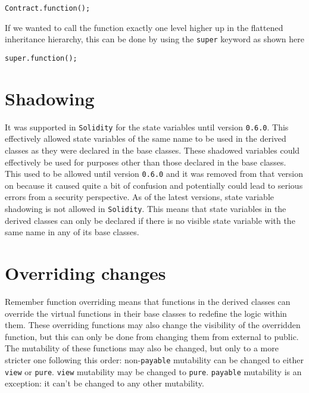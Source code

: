 \begin{lstlisting}[language=Solidity, style=solStyle, caption={Explicit function call from base class example}]
Contract.function();
\end{lstlisting}

If we wanted to call the function exactly one level higher up in the flattened inheritance hierarchy, this can be done by using the \verb|super| keyword as shown here

\begin{lstlisting}[language=Solidity, style=solStyle, caption={"One level up" function call from base class example}]
super.function();
\end{lstlisting}

\section{Shadowing}
It was supported in \verb|Solidity| for the state variables until version \verb|0.6.0|. This effectively allowed state variables of the same name to be used in the derived classes as they were declared in the base classes. These shadowed variables could effectively be used for purposes other than those declared in the base classes. This used to be allowed until version \verb|0.6.0| and it was removed from that version on because it caused quite a bit of confusion and potentially could lead to serious errors from a security perspective. As of the latest versions, state variable shadowing is not allowed in \verb|Solidity|. This means that state variables in the derived classes can only be declared if there is no visible state variable with the same name in any of its base classes.

\section{Overriding changes}
Remember function overriding means that functions in the derived classes can override the virtual functions in their base classes to redefine the logic within them. These overriding functions may also change the visibility of the overridden function, but this can only be done from changing them from external to public. The mutability of these functions may also be changed, but only to a more stricter one following this order: non-\verb|payable| mutability can be changed to either \verb|view| or \verb|pure|. \verb|view| mutability may be changed to \verb|pure|. \verb|payable| mutability is an exception: it can't be changed to any other mutability.

